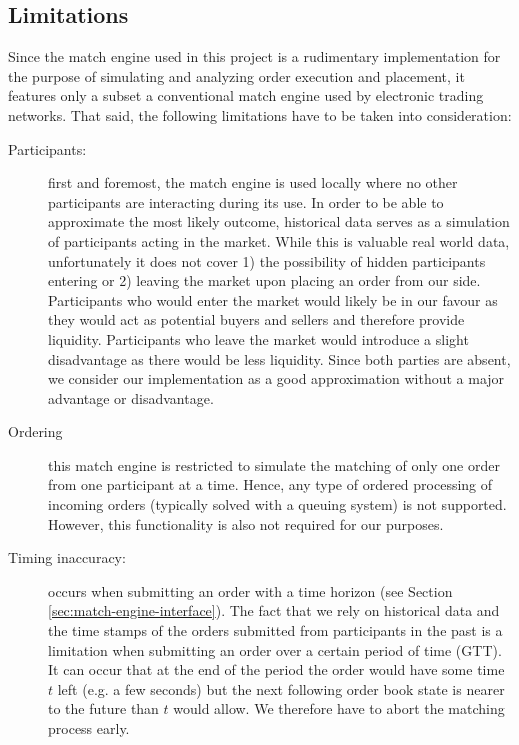 \subsection{Limitations}

Since the match engine used in this project is a rudimentary implementation for the purpose of simulating and analyzing order execution and placement, it features only a subset a conventional match engine used by electronic trading networks.
That said, the following limitations have to be taken into consideration:
\begin{description}
    \item[Participants:] first and foremost, the match engine is used locally where no other participants are interacting during its use.
    In order to be able to approximate the most likely outcome, historical data serves as a simulation of participants acting in the market.
    While this is valuable real world data, unfortunately it does not cover 1) the possibility of hidden participants entering or 2) leaving the market upon placing an order from our side.
    Participants who would enter the market would likely be in our favour as they would act as potential buyers and sellers and therefore provide liquidity.
    Participants who leave the market would introduce a slight disadvantage as there would be less liquidity.
    Since both parties are absent, we consider our implementation as a good approximation without a major advantage or disadvantage.
    
    \item[Ordering]this match engine is restricted to simulate the matching of only one order from one participant at a time.
    Hence, any type of ordered processing of incoming orders (typically solved with a queuing system) is not supported.
    However, this functionality is also not required for our purposes.
    
    \item[Timing inaccuracy:] occurs when submitting an order with a time horizon (see Section \ref{sec:match-engine-interface}).
    The fact that we rely on historical data and the time stamps of the orders submitted from participants in the past is a limitation when submitting an order over a certain period of time (GTT).
    It can occur that at the end of the period the order would have some time $t$ left (e.g. a few seconds) but the next following order book state is nearer to the future than $t$ would allow.
    We therefore have to abort the matching process early.
    
\end{description}



